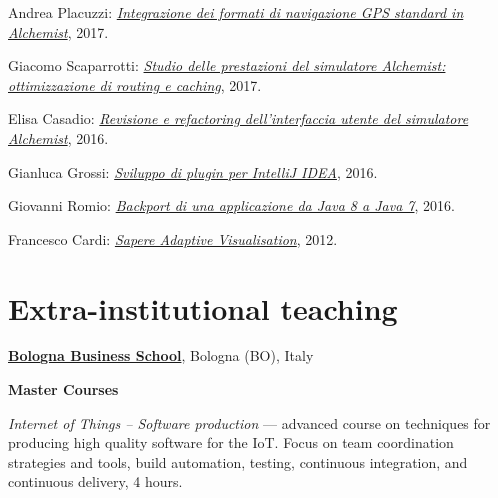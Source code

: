 \begin{innerlist}
    \item Andrea Placuzzi: \href{http://amslaurea.unibo.it/14329/}{\textit{Integrazione dei formati di navigazione GPS standard in Alchemist}}, 2017.
    \item Giacomo Scaparrotti: \href{http://amslaurea.unibo.it/14019/}{\textit{Studio delle prestazioni del simulatore Alchemist: ottimizzazione di routing e caching}}, 2017.
    \item Elisa Casadio: \href{http://amslaurea.unibo.it/12310/}{\textit{Revisione e refactoring dell'interfaccia utente del simulatore Alchemist}}, 2016.
    \item Gianluca Grossi: \href{http://amslaurea.unibo.it/12503/}{\textit{Sviluppo di plugin per IntelliJ IDEA}}, 2016.
    \item Giovanni Romio: \href{http://amslaurea.unibo.it/10481/}{\textit{Backport di una applicazione da Java 8 a Java 7}}, 2016.
    \item Francesco Cardi: \href{http://archive.fo/zMGo8}{\textit{Sapere Adaptive Visualisation}}, 2012.
\end{innerlist}

\section{Extra-institutional teaching}
\href{https://www.bbs.unibo.eu/hp/}{\textbf{Bologna Business School}}, Bologna (BO), Italy
\begin{outerlist}
\item[] \textbf{Master Courses} %
    \begin{innerlist}
        \item \textit{Internet of Things -- Software production} --- advanced course on techniques for producing high quality software for the IoT. Focus on team coordination strategies and tools, build automation, testing, continuous integration, and continuous delivery, 4 hours.
\end{innerlist}
\halfblankline
\end{outerlist}

